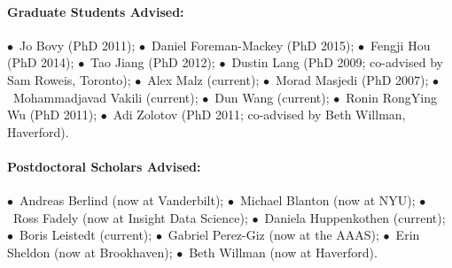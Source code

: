 \documentclass[letterpaper,12pt]{article}
\begin{document}
\paragraph{Graduate Students Advised:}
$\bullet$~Jo Bovy (PhD 2011);
$\bullet$~Daniel Foreman-Mackey (PhD 2015);
$\bullet$~Fengji Hou (PhD 2014);
$\bullet$~Tao Jiang (PhD 2012);
$\bullet$~Dustin Lang (PhD 2009; co-advised by Sam Roweis, Toronto);
$\bullet$~Alex Malz (current);
$\bullet$~Morad Masjedi (PhD 2007);
$\bullet$~Mohammadjavad Vakili (current);
$\bullet$~Dun Wang (current);
$\bullet$~Ronin RongYing Wu (PhD 2011);
$\bullet$~Adi Zolotov (PhD 2011; co-advised by Beth Willman, Haverford).

\paragraph{Postdoctoral Scholars Advised:}
$\bullet$~Andreas Berlind (now at Vanderbilt);
$\bullet$~Michael Blanton (now at NYU);
$\bullet$~Ross Fadely (now at Insight Data Science);
$\bullet$~Daniela Huppenkothen (current);
$\bullet$~Boris Leistedt (current);
$\bullet$~Gabriel Perez-Giz (now at the AAAS);
$\bullet$~Erin Sheldon (now at Brookhaven);
$\bullet$~Beth Willman (now at Haverford).
\end{document}
